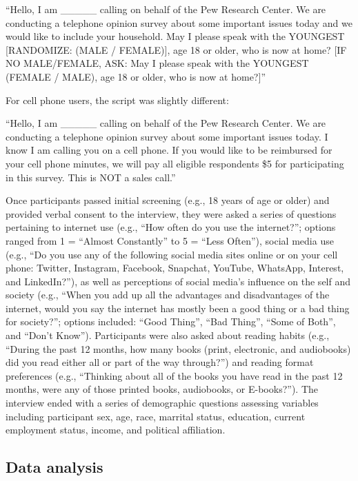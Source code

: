 \documentclass[man, fleqn, noextraspace]{apa6}
\theoremstyle{definition}
\theoremstyle{definition}
\theoremstyle{definition}
\theoremstyle{remark}
\begin{document}
\enquote{Hello, I am \_\_\_\_\_ calling on behalf of the Pew Research
Center. We are conducting a telephone opinion survey about some
important issues today and we would like to include your household. May
I please speak with the YOUNGEST {[}RANDOMIZE: (MALE / FEMALE){]}, age
18 or older, who is now at home? {[}IF NO MALE/FEMALE, ASK: May I please
speak with the YOUNGEST (FEMALE / MALE), age 18 or older, who is now at
home?{]}}

For cell phone users, the script was slightly different:

\enquote{Hello, I am \_\_\_\_\_ calling on behalf of the Pew Research
Center. We are conducting a telephone opinion survey about some
important issues today. I know I am calling you on a cell phone. If you
would like to be reimbursed for your cell phone minutes, we will pay all
eligible respondents \$5 for participating in this survey. This is NOT a
sales call.}

Once participants passed initial screening (e.g., 18 years of age or
older) and provided verbal consent to the interview, they were asked a
series of questions pertaining to internet use (e.g., \enquote{How often
do you use the internet?}; options ranged from 1 = \enquote{Almost
Constantly} to 5 = \enquote{Less Often}), social media use (e.g.,
\enquote{Do you use any of the following social media sites online or on
your cell phone: Twitter, Instagram, Facebook, Snapchat, YouTube,
WhatsApp, Interest, and LinkedIn?}), as well as perceptions of social
media's influence on the self and society (e.g., \enquote{When you add
up all the advantages and disadvantages of the internet, would you say
the internet has mostly been a good thing or a bad thing for society?};
options included: \enquote{Good Thing}, \enquote{Bad Thing},
\enquote{Some of Both}, and \enquote{Don't Know}). Participants were
also asked about reading habits (e.g., \enquote{During the past 12
months, how many books (print, electronic, and audiobooks) did you read
either all or part of the way through?}) and reading format preferences
(e.g., \enquote{Thinking about all of the books you have read in the
past 12 months, were any of those printed books, audiobooks, or
E-books?}). The interview ended with a series of demographic questions
assessing variables including participant sex, age, race, marrital
status, education, current employment status, income, and political
affiliation.

\subsection{Data analysis}\label{data-analysis}
\end{document}
